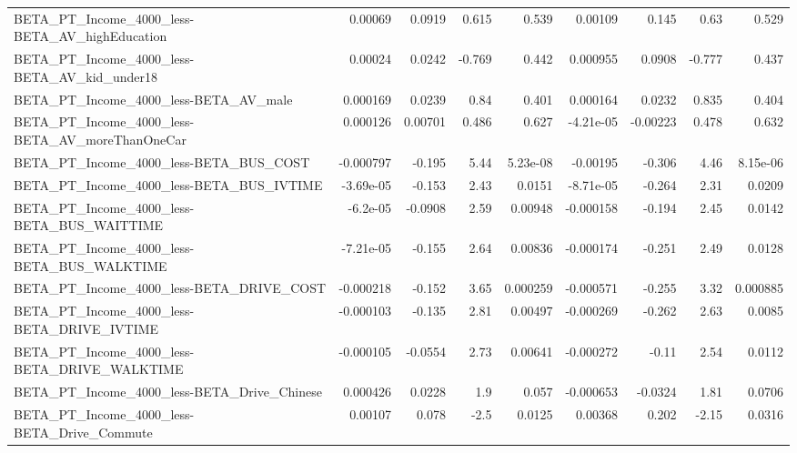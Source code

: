 \begin{tabular}{lrrrrrrrr}
BETA\_PT\_Income\_4000\_less-BETA\_AV\_highEducation     &     0.00069 &       0.0919 &    0.615 &    0.539 &    0.00109 &       0.145 &         0.63 &         0.529 \\
BETA\_PT\_Income\_4000\_less-BETA\_AV\_kid\_under18       &     0.00024 &       0.0242 &   -0.769 &    0.442 &   0.000955 &      0.0908 &       -0.777 &         0.437 \\
BETA\_PT\_Income\_4000\_less-BETA\_AV\_male              &    0.000169 &       0.0239 &     0.84 &    0.401 &   0.000164 &      0.0232 &        0.835 &         0.404 \\
BETA\_PT\_Income\_4000\_less-BETA\_AV\_moreThanOneCar    &    0.000126 &      0.00701 &    0.486 &    0.627 &  -4.21e-05 &    -0.00223 &        0.478 &         0.632 \\
BETA\_PT\_Income\_4000\_less-BETA\_BUS\_COST             &   -0.000797 &       -0.195 &     5.44 & 5.23e-08 &   -0.00195 &      -0.306 &         4.46 &      8.15e-06 \\
BETA\_PT\_Income\_4000\_less-BETA\_BUS\_IVTIME           &   -3.69e-05 &       -0.153 &     2.43 &   0.0151 &  -8.71e-05 &      -0.264 &         2.31 &        0.0209 \\
BETA\_PT\_Income\_4000\_less-BETA\_BUS\_WAITTIME         &    -6.2e-05 &      -0.0908 &     2.59 &  0.00948 &  -0.000158 &      -0.194 &         2.45 &        0.0142 \\
BETA\_PT\_Income\_4000\_less-BETA\_BUS\_WALKTIME         &   -7.21e-05 &       -0.155 &     2.64 &  0.00836 &  -0.000174 &      -0.251 &         2.49 &        0.0128 \\
BETA\_PT\_Income\_4000\_less-BETA\_DRIVE\_COST           &   -0.000218 &       -0.152 &     3.65 & 0.000259 &  -0.000571 &      -0.255 &         3.32 &      0.000885 \\
BETA\_PT\_Income\_4000\_less-BETA\_DRIVE\_IVTIME         &   -0.000103 &       -0.135 &     2.81 &  0.00497 &  -0.000269 &      -0.262 &         2.63 &        0.0085 \\
BETA\_PT\_Income\_4000\_less-BETA\_DRIVE\_WALKTIME       &   -0.000105 &      -0.0554 &     2.73 &  0.00641 &  -0.000272 &       -0.11 &         2.54 &        0.0112 \\
BETA\_PT\_Income\_4000\_less-BETA\_Drive\_Chinese        &    0.000426 &       0.0228 &      1.9 &    0.057 &  -0.000653 &     -0.0324 &         1.81 &        0.0706 \\
BETA\_PT\_Income\_4000\_less-BETA\_Drive\_Commute        &     0.00107 &        0.078 &     -2.5 &   0.0125 &    0.00368 &       0.202 &        -2.15 &        0.0316 \\

\end{tabular}
